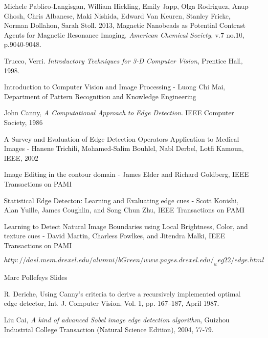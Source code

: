 \documentclass[a4paper,12pt]{article}
\begin{document}
\newpage
\singlespacing
\begin{thebibliography}{9}


Michele Pablico-Langisgan, William Hickling, Emily Japp, Olga Rodriguez, Anup Ghosh, Chris Albanese, Maki Nishida, Edward Van Keuren, Stanley Fricke, Norman Dollahon, Sarah Stoll. 2013, Magnetic Nanobeads as Potential Contrast Agents for Magnetic Resonance Imaging, {\em American Chemical Society}, v.7 no.10, p.9040-9048.

Trucco, Verri. {\em Introductory Techniques for 3-D Computer Vision}, Prentice Hall, 1998.

Introduction to Computer Vision and Image Processing - Luong Chi Mai, Department of Pattern Recognition and Knowledge Engineering

John Canny, {\em A Computational Approach to Edge Detection}. IEEE Computer Society, 1986

A Survey and Evaluation of Edge Detection Operators Application to Medical Images - Hanene Trichili, Mohamed-Salim Bouhlel, Nabl Derbel, Lotfi Kamoun, IEEE, 2002

Image Editing in the contour domain - James Elder and Richard Goldberg, IEEE Transactions on PAMI

Statistical Edge Detecton: Learning and Evaluating edge cues - Scott Konishi, Alan Yuille, James Coughlin, and Song Chun Zhu, IEEE Transactions on PAMI

Learning to Detect Natural Image Boundaries using Local Brightness, Color, and texture cues - David Martin, Charless Fowlkes, and Jitendra Malki, IEEE Transactions on PAMI

$http://dasl.mem.drexel.edu/alumni/bGreen/www.pages.drexel.edu/_weg22/edge.html
$

Marc Pollefeys Slides

R. Deriche, Using Canny's criteria to derive a recursively implemented optimal edge detector, Int. J. Computer Vision, Vol. 1, pp. 167–187, April 1987.

Liu Cai,  {\em A  kind  of  advanced  Sobel  image  edge detection  algorithm}, Guizhou Industrial College Transaction (Natural Science Edition), 2004, 77-79. 



\end{thebibliography}
\end{document}
